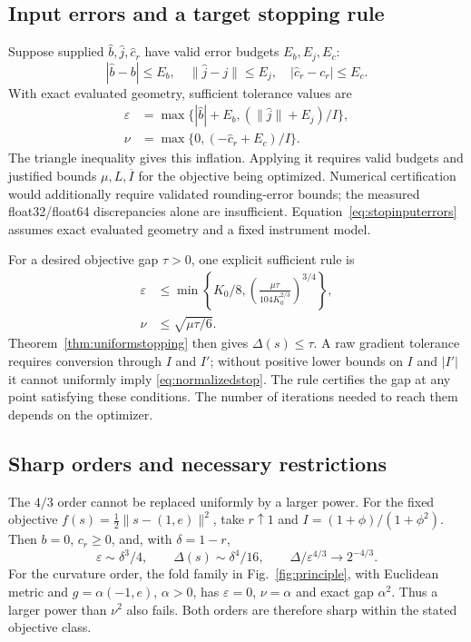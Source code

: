 \subsection{Input errors and a target stopping rule}
Suppose supplied $\widehat b,\widehat j,\widehat c_r$ have valid error budgets $E_b,E_j,E_c$:
\begin{equation}
 |\widehat b-b|\le E_b,\quad\|\widehat j-j\|\le E_j,
 \quad|\widehat c_r-c_r|\le E_c.
 \label{eq:stopinputerrors}
\end{equation}
With exact evaluated geometry, sufficient tolerance values are
\begin{equation}
 \begin{aligned}
 \varepsilon&=\max\{ |\widehat b|+E_b,
                         (\|\widehat j\|+E_j)/I\},\\
 \nu&=\max\{0,(-\widehat c_r+E_c)/I\}.
 \end{aligned}
 \label{eq:stopinflation}
\end{equation}
The triangle inequality gives this inflation. Applying it requires valid budgets and justified bounds $\mu,L,\overline I$ for the objective being optimized. Numerical certification would additionally require validated rounding-error bounds; the measured float32/float64 discrepancies alone are insufficient. Equation~\eqref{eq:stopinputerrors} assumes exact evaluated geometry and a fixed instrument model.

For a desired objective gap $\tau>0$, one explicit sufficient rule is
\begin{equation}
 \begin{aligned}
 \varepsilon&\le\min\!\left\{K_0/8,
            \left(\frac{\mu\tau}{104K_0^{2/3}}\right)^{3/4}\right\},\\
 \nu&\le\sqrt{\mu\tau/6}.
 \end{aligned}
 \label{eq:targetstop}
\end{equation}
Theorem~\ref{thm:uniformstopping} then gives $\Delta(s)\le\tau$. A raw gradient tolerance requires conversion through $I$ and $I'$; without positive lower bounds on $I$ and $|I'|$ it cannot uniformly imply \eqref{eq:normalizedstop}. The rule certifies the gap at any point satisfying these conditions. The number of iterations needed to reach them depends on the optimizer.

\subsection{Sharp orders and necessary restrictions}
The $4/3$ order cannot be replaced uniformly by a larger power. For the fixed objective $f(s)=\tfrac12\|s-(1,e)\|^2$, take $r\uparrow1$ and $I=(1+\phi)/(1+\phi^2)$. Then $b=0$, $c_r\ge0$, and, with $\delta=1-r$,
\begin{equation}
 \varepsilon\sim\delta^3/4,\qquad
 \Delta(s)\sim\delta^4/16,\qquad
 \Delta/\varepsilon^{4/3}\to2^{-4/3}.
 \label{eq:stopsharpfirst}
\end{equation}
For the curvature order, the fold family in Fig.~\ref{fig:principle}, with Euclidean metric and $g=\alpha(-1,e)$, $\alpha>0$, has $\varepsilon=0$, $\nu=\alpha$ and exact gap $\alpha^2$. Thus a larger power than $\nu^2$ also fails. Both orders are therefore sharp within the stated objective class.

